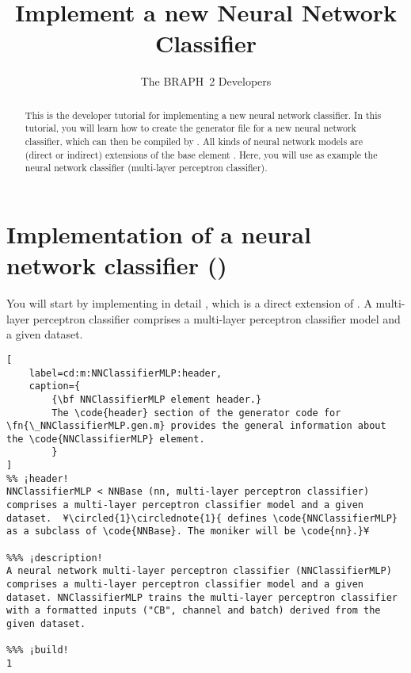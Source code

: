 \documentclass{tufte-handout}
\title{Implement a new Neural Network Classifier}
\author[The BRAPH~2 Developers]{The BRAPH~2 Developers}
\begin{document}
\maketitle

\begin{abstract}
\noindent
This is the developer tutorial for implementing a new neural network classifier. 
In this tutorial, you will learn how to create the generator file  for a new neural network classifier, which can then be compiled by . All kinds of neural network models are (direct or indirect) extensions of the base element . Here, you will use as example the neural network classifier  (multi-layer perceptron classifier).
\end{abstract}

\tableofcontents

\clearpage

\section{Implementation of a neural network classifier ()}

You will start by implementing in detail , which is a direct extension of .
A multi-layer perceptron classifier  comprises a multi-layer perceptron classifier model and a given dataset.

\begin{lstlisting}[
	label=cd:m:NNClassifierMLP:header,
	caption={
		{\bf NNClassifierMLP element header.}
		The \code{header} section of the generator code for \fn{\_NNClassifierMLP.gen.m} provides the general information about the \code{NNClassifierMLP} element.
		}
]
%% ¡header!
NNClassifierMLP < NNBase (nn, multi-layer perceptron classifier) comprises a multi-layer perceptron classifier model and a given dataset.  ¥\circled{1}\circlednote{1}{ defines \code{NNClassifierMLP} as a subclass of \code{NNBase}. The moniker will be \code{nn}.}¥

%%% ¡description!
A neural network multi-layer perceptron classifier (NNClassifierMLP) comprises a multi-layer perceptron classifier model and a given dataset. NNClassifierMLP trains the multi-layer perceptron classifier with a formatted inputs ("CB", channel and batch) derived from the given dataset.

%%% ¡build!
1
\end{lstlisting}
\end{document}
